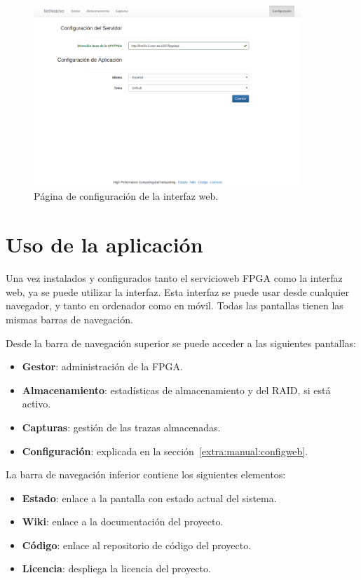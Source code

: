 \begin{figure}[!htp]
  \centering
  \includegraphics[width=0.9\textwidth,clip=true]{graphics/capturas/configuracion_tema_base}
  \caption{Página de configuración de la interfaz web.}
  \label{fig:captura:configuracion}
\end{figure}


\section{Uso de la aplicación\label{extra:manual:uso}}
Una vez instalados y configurados tanto el \gls{servicioweb} \gls{FPGA} como la interfaz web, ya se puede utilizar la interfaz.
Esta interfaz se puede usar desde cualquier navegador, y tanto en ordenador como en móvil. Todas las pantallas tienen las mismas barras de navegación.

Desde la barra de navegación superior se puede acceder a las siguientes pantallas:
\begin{itemize}
  \item \textbf{Gestor}: administración de la \gls{FPGA}.
  \item \textbf{Almacenamiento}: estadísticas de almacenamiento y del \gls{RAID}, si está activo.
  \item \textbf{Capturas}: gestión de las \glspl{traza} almacenadas.
  \item \textbf{Configuración}: explicada en la sección~\ref{extra:manual:configweb}.
\end{itemize}

La barra de navegación inferior contiene los siguientes elementos:
\begin{itemize}
  \item \textbf{Estado}: enlace a la pantalla con estado actual del sistema.
  \item \textbf{Wiki}: enlace a la documentación del proyecto.
  \item \textbf{Código}: enlace al repositorio de código del proyecto.
  \item \textbf{Licencia}: despliega la licencia del proyecto.
\end{itemize}


